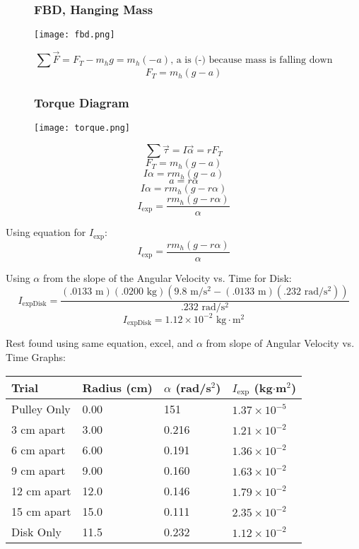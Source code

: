 \documentclass[fleqn]{article}
\begin{document}
\begin{figure}[H]
	\subsubsection*{FBD, Hanging Mass}
	\texttt{[image: fbd.png]}
\end{figure}

\[ \sum \vec{F} = F_T-m_hg=m_h(- a ) \text{, a is (-) because mass is falling down}  \]
\[ F_T=m_h(g- a) \]

\begin{figure}[H]
	\subsubsection*{Torque Diagram}
	\texttt{[image: torque.png]}
\end{figure}

\[ \sum \vec{\tau} =I \vec{\alpha} =r F_T\]
\[ F_T=m_h(g- a) \]
\[ I \alpha =r m_h(g- a) \]
\[ a = r \alpha \]
\[ I \alpha = rm_h \left( g-r \alpha \right) \]
\[ I _{\text{exp} } = \frac{rm_h \left( g-r \alpha \right)}{\alpha}  \]

Using equation for $I _{\text{exp} } $:
\[ I _{\text{exp} } = \frac{rm_h \left( g-r \alpha \right)}{\alpha}  \]

Using $\alpha$ from the slope of the Angular Velocity vs. Time for Disk:
\[ I _{\text{expDisk} } =\frac{\left( .0133 \text{ m}  \right)
		\left( .0200 \text{ kg}  \right)
		\left( 9.8 \text{ m/s$^2$} -
		\left( .0133 \text{ m}  \right)
		\left(.232 \text{ rad/s$^2$}  \right)
		\right)
	}{.232 \text{ rad/s$^2$} }  \]
\[ I _{\text{expDisk} } = 1.12 \times 10^{-2} \text{ kg$\cdot$m$^2$}  \]

Rest found using same equation, excel, and $\alpha$ from slope of Angular Velocity vs. Time Graphs:
\begin{table}[H]
	\setlength{\extrarowheight}{2pt}
	\begin{tabular}{|l|l|l|l|}
		\hline
		Trial       & Radius (cm) & $\alpha$ (rad/s$^2$) & $I_{\text{exp} } $ (kg$\cdot$m$^2$) \\ \hline
		Pulley Only & 0.00        & 151                  & $1.37 \times 10^{-5}$               \\ \hline
		3 cm apart  & 3.00        & 0.216                & $1.21 \times 10^{-2}$               \\ \hline
		6 cm apart  & 6.00        & 0.191                & $1.36 \times 10^{-2}$               \\ \hline
		9 cm apart  & 9.00        & 0.160                & $1.63 \times 10^{-2}$               \\ \hline
		12 cm apart & 12.0        & 0.146                & $1.79 \times 10^{-2}$               \\ \hline
		15 cm apart & 15.0        & 0.111                & $2.35 \times 10^{-2}$               \\ \hline
		Disk Only   & 11.5        & 0.232                & $1.12 \times 10^{-2}$               \\ \hline
	\end{tabular}
\end{table}
\end{document}
